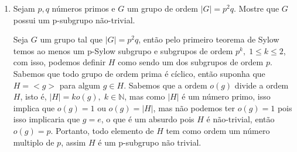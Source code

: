 \documentclass{article}
\begin{document}
\begin{enumerate}
		\item Sejam $p,q$ números primos e $G$ um grupo de ordem $|G| = p^{2}q$. Mostre que $G$ possui um p-subgrupo não-trivial.
		
		Seja $G$ um grupo tal que $|G| = p^{2}q$, então pelo primeiro teorema de Sylow temos ao menos um p-Sylow subgrupo e subgrupos de ordem $p^{k}, \; 1 \leq k \leq 2$, com isso, podemos definir $H$ como sendo um dos subgrupos de ordem $p$. Sabemos que todo grupo de ordem prima é cíclico, então suponha que $H = <g>$ para algum $g \in H$. Sabemos que a ordem $o(g)$ divide a ordem $H$, isto é, $|H| = ko(g), \; k \in \mathbb{N}$, mas como $|H|$ é um número primo, isso implica que $o(g) = 1$ ou $o(g) = |H|$, mas não podemos ter $o(g) = 1$ pois isso implicaria que $g = e$, o que é um absurdo pois $H$ é não-trivial, então $o(g) = p$. Portanto, todo elemento de $H$ tem como ordem um número multiplo de $p$, assim $H$ é um p-subgrupo não trivial.
		
	\end{enumerate}
	
	
\end{document}
